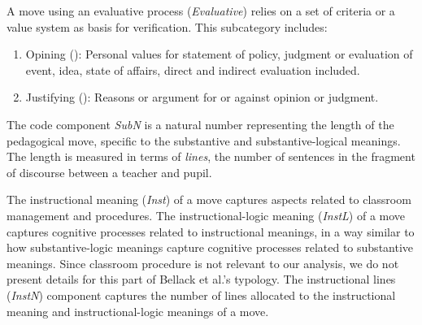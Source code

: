 \documentclass[conference]{IEEEtran}
\begin{document}
\noindent
%
A move using an evaluative process (\emph{Evaluative}) relies on a set of
criteria or a value system as basis for verification. This subcategory includes:
%
\begin{enumerate}

\item Opining (): Personal values for statement of policy, judgment
or evaluation of event, idea, state of affairs, direct and indirect evaluation
included.

\item Justifying (): Reasons or argument for or against opinion or
judgment.

\end{enumerate}

\noindent
%
The code component \emph{SubN} is a natural number representing the length of
the pedagogical move, specific to the substantive and substantive-logical
meanings. The length is measured in terms of \emph{lines}, the number of
sentences in the fragment of discourse between a teacher and pupil.


The instructional meaning (\emph{Inst}) of a move captures aspects related to
classroom management and procedures. The instructional-logic meaning
(\emph{InstL}) of a move captures cognitive processes related to instructional
meanings, in a way similar to how substantive-logic meanings capture cognitive
processes related to substantive meanings.
%
Since classroom procedure is not relevant to our analysis, we do not present
details for this part of Bellack et al.'s typology.
%
The instructional lines (\emph{InstN}) component captures the number of lines
allocated to the instructional meaning and instructional-logic meanings of a
move.
\end{document}
